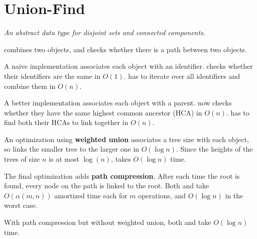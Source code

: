 \section{Union-Find}
\emph{An abstract data type for disjoint sets and connected components.}

 combines two objects, and  checks whether there is a path between two objects.

A naive implementation associates each object with an identifier.
 checks whether their identifiers are the same in $O(1)$.
 has to iterate over all identifiers and combine them in $O(n)$.

A better implementation associates each object with a parent.
 now checks whether they have the same highest common ancestor (HCA) in $O(n)$.
 has to find both their HCAs to link together in $O(n)$.

An optimization using \textbf{weighted union} associates a tree size with each object,
so  links the smaller tree to the larger one in $O(\log n)$.
Since the heights of the trees of size $n$ is at most $\log(n)$,  takes $O(\log n)$ time.

The final optimization adds \textbf{path compression}.
After each time the root is found, every node on the path is linked to the root.
Both  and  take $O(\alpha(m, n))$ amortized time each for $m$ operations,
and $O(\log n)$ in the worst case.

With path compression but without weighted union, both  and  take $O(\log n)$ time.